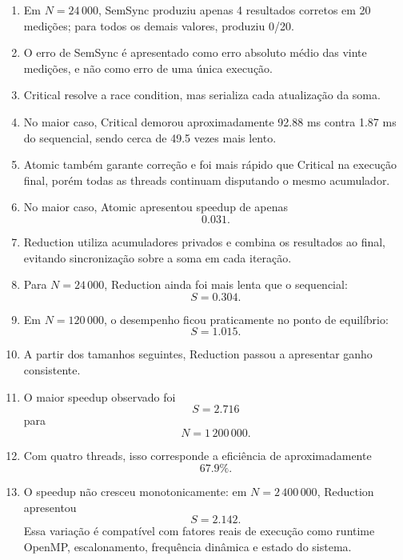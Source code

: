 \begin{enumerate}
    \item Em \(N=24\,000\), SemSync produziu apenas 4 resultados corretos em
    20 medições; para todos os demais valores, produziu 0/20.

    \item O erro de SemSync é apresentado como erro absoluto médio das vinte
    medições, e não como erro de uma única execução.

    \item Critical resolve a race condition, mas serializa cada atualização
    da soma.

    \item No maior caso, Critical demorou aproximadamente 92.88 ms contra
    1.87 ms do sequencial, sendo cerca de 49.5 vezes mais lento.

    \item Atomic também garante correção e foi mais rápido que Critical na
    execução final, porém todas as threads continuam disputando o mesmo
    acumulador.

    \item No maior caso, Atomic apresentou speedup de apenas
    \[
        0.031.
    \]

    \item Reduction utiliza acumuladores privados e combina os resultados ao
    final, evitando sincronização sobre a soma em cada iteração.

    \item Para \(N=24\,000\), Reduction ainda foi mais lenta que o
    sequencial:
    \[
        S=0.304.
    \]

    \item Em \(N=120\,000\), o desempenho ficou praticamente no ponto de
    equilíbrio:
    \[
        S=1.015.
    \]

    \item A partir dos tamanhos seguintes, Reduction passou a apresentar
    ganho consistente.

    \item O maior speedup observado foi
    \[
        S=2.716
    \]
    para
    \[
        N=1\,200\,000.
    \]

    \item Com quatro threads, isso corresponde a eficiência de
    aproximadamente
    \[
        67.9\%.
    \]

    \item O speedup não cresceu monotonicamente: em
    \(N=2\,400\,000\), Reduction apresentou
    \[
        S=2.142.
    \]
    Essa variação é compatível com fatores reais de execução como runtime
    OpenMP, escalonamento, frequência dinâmica e estado do sistema.


\end{enumerate}
